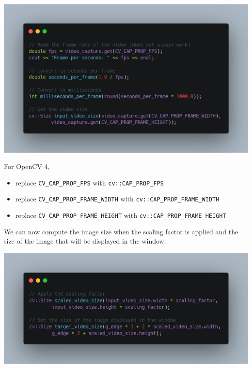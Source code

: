 \documentclass[english,a4paper,12pt,oneside]{article}
\begin{document}
% 
% 
% 
\includegraphics[width=\linewidth]{carbon(3)}

For OpenCV 4,
\begin{itemize}
\item replace \verb+CV_CAP_PROP_FPS+ with \verb+cv::CAP_PROP_FPS+
\item replace \verb+CV_CAP_PROP_FRAME_WIDTH+ with \verb+cv::CAP_PROP_FRAME_WIDTH+
\item replace \verb+CV_CAP_PROP_FRAME_HEIGHT+ with \verb+cv::CAP_PROP_FRAME_HEIGHT+
\end{itemize}


We can now compute the image size when the scaling factor is applied and the size of the image that will be displayed in the window:

% 
\includegraphics[width=\linewidth]{carbon(4)}
\end{document}
